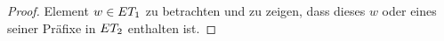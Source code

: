 \begin{proof}
  Element $w\in ET _1$ zu betrachten und zu zeigen, dass dieses $w$ oder eines
  seiner Präfixe in $ET _2$ enthalten ist.

\end{proof}

